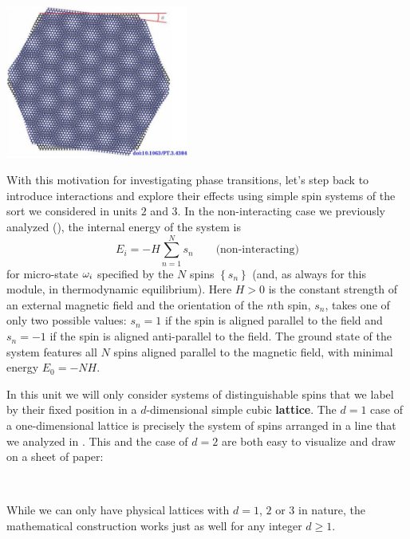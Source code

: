 \begin{center}\includegraphics[width=0.45\textwidth]{figs/unit09_graphene.pdf}\end{center} %

With this motivation for investigating phase transitions, let's step back to introduce interactions and explore their effects using simple spin systems of the sort we considered in units $2$ and $3$.
In the non-interacting case we previously analyzed (), the internal energy of the system is
\begin{equation*}
  E_i = -H \sum_{n = 1}^N s_n \qquad \mbox{(non-interacting)}
\end{equation*}
for micro-state $\omega_i$ specified by the $N$ spins $\left\{s_n\right\}$ (and, as always for this module, in thermodynamic equilibrium).
Here $H > 0$ is the constant strength of an external magnetic field and the orientation of the $n$th spin, $s_n$, takes one of only two possible values: $s_n = 1$ if the spin is aligned parallel to the field and $s_n = -1$ if the spin is aligned anti-parallel to the field.
The ground state of the system features all $N$ spins aligned parallel to the magnetic field, with minimal energy $E_0 = -NH$.

In this unit we will only consider systems of distinguishable spins that we label by their fixed position in a $d$-dimensional simple cubic \textbf{lattice}.
The $d = 1$ case of a one-dimensional lattice is precisely the system of spins arranged in a line that we analyzed in .
This and the case of $d = 2$ are both easy to visualize and draw on a sheet of paper:
\begin{mdframed}
  \ \\[100 pt]
\end{mdframed}
While we can only have physical lattices with $d = 1$, $2$ or $3$ in nature, the mathematical construction works just as well for any integer $d \geq 1$.

